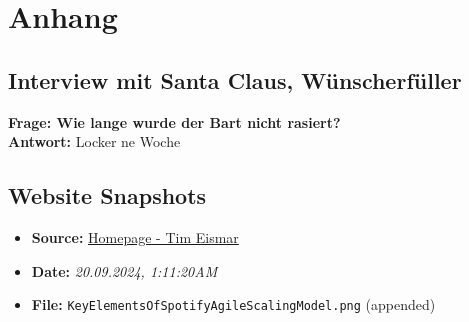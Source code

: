 

\appendix
{}  %
\section{Anhang}
\label{appendix:Anhang}

\subsection{Interview mit Santa Claus, Wünscherfüller}

\textbf{Frage: Wie lange wurde der Bart nicht rasiert?} \\
\textbf{Antwort:} Locker ne Woche

\subsection{Website Snapshots}
\begin{tcolorbox}[colframe=telekommagenta, colback=white, coltitle=black, title=Personal Webiste of Tim Eismar, sharp corners]
    \begin{itemize}
        \item \textbf{Source:} \href{https://teismar.de}{\textcolor{telekommagenta}{Homepage - Tim Eismar}}
        \item \textbf{Date:} \textit{20.09.2024, 1:11:20AM}
        \item \textbf{File:} \texttt{KeyElementsOfSpotifyAgileScalingModel.png} (appended)
    \end{itemize}
\end{tcolorbox}

